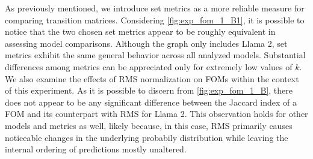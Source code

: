 \begin{table}
    \centering
    \caption{Visualization of the most likely token predicted by FOM, FOM with RMS and Markov model given common input tokens for Llama 2, Mistral and Phi 3.5.}
    \label{table:exp_fom_predictions}
\end{table}

As previously mentioned, we introduce set metrics as a more reliable measure for comparing transition matrices.
Considering \cref{fig:exp_fom_1_B1}, it is possible to notice that the two chosen set metrics appear to be roughly equivalent in assessing model comparisons.
Although the graph only includes Llama 2, set metrics exhibit the same general behavior across all analyzed models.
Substantial differences among metrics can be appreciated only for extremely low values of $k$.
We also examine the effects of RMS normalization on FOMs within the context of this experiment.
As it is possible to discern from \cref{fig:exp_fom_1_B}, there does not appear to be any significant difference between the Jaccard index of a FOM and its counterpart with RMS for Llama 2.
This observation holds for other models and metrics as well, likely because, in this case, RMS primarily causes noticeable changes in the underlying probabily distribution while leaving the internal ordering of predictions mostly unaltered.

